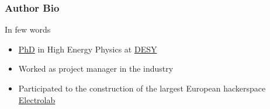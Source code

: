 
\begin{frame}
  \frametitle{Author Bio}
  In few words
  \begin{itemize}
  \item \href{https://www-h1.desy.de/psfiles/ps4/theses/h1th-464.pdf}{PhD} in High Energy Physics at \href{http://www.desy.de}{DESY}
  \item Worked as project manager in the industry
  \item Participated to the construction of the largest European hackerspace \href{http://www.electrolab.fr}{Electrolab}
  \end{itemize}
\end{frame}

